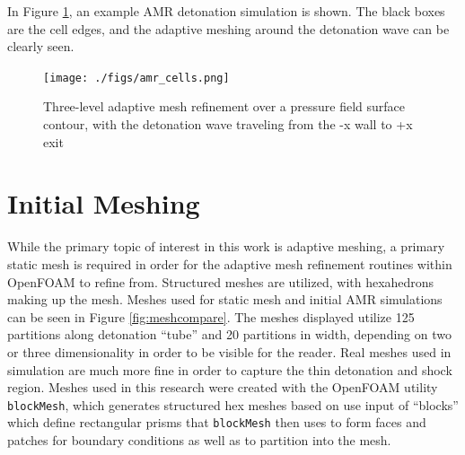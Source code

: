 In Figure \ref{fig:examr}, an example AMR detonation simulation is shown. The black boxes are the cell edges, and the adaptive meshing around the detonation wave can be clearly seen. 

\begin{figure}
\centering
\texttt{[image: ./figs/amr\_cells.png]}
\caption{Three-level adaptive mesh refinement over a pressure field surface contour, with the detonation wave traveling from the -x wall to +x exit}
\label{fig:examr}
\end{figure}






\section{Initial Meshing}
While the primary topic of interest in this work is adaptive meshing, a primary static mesh is required in order for the adaptive mesh refinement routines within OpenFOAM to refine from. Structured meshes are utilized, with hexahedrons making up the mesh. Meshes used for static mesh and initial AMR simulations can be seen in Figure \ref{fig:meshcompare}. The meshes displayed utilize 125 partitions along detonation ``tube'' and 20 partitions in width, depending on two or three dimensionality in order to be visible for the reader. Real meshes used in simulation are much more fine in order to capture the thin detonation and shock region. Meshes used in this research were created with the OpenFOAM utility \verb|blockMesh|, which generates structured hex meshes based on use input of ``blocks'' which define rectangular prisms that \verb|blockMesh| then uses to form faces and patches for boundary conditions as well as to partition into the mesh. 

